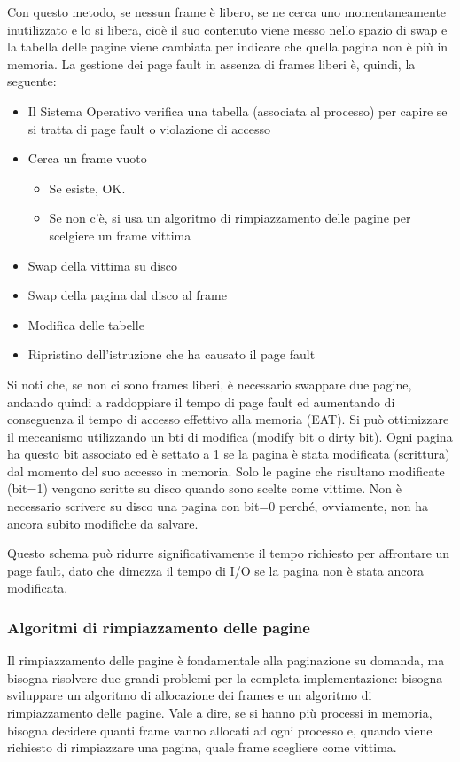 \documentclass[a4paper]{article}
\begin{document}
Con questo metodo, se nessun frame è libero, se ne cerca uno momentaneamente inutilizzato e lo si libera, cioè il suo contenuto viene messo nello spazio di swap e la tabella delle pagine viene cambiata per indicare che quella pagina non è più in memoria. La gestione dei page fault in assenza di frames liberi è, quindi, la seguente:
\begin{itemize}
    \item Il Sistema Operativo verifica una tabella (associata al processo) per capire se si tratta di page fault o violazione di accesso
    \item Cerca un frame vuoto
          \begin{itemize}
              \item Se esiste, OK.
              \item Se non c'è, si usa un algoritmo di rimpiazzamento delle pagine per scelgiere un frame vittima
          \end{itemize}
    \item Swap della vittima su disco
    \item Swap della pagina dal disco al frame
    \item Modifica delle tabelle
    \item Ripristino dell'istruzione che ha causato il page fault
\end{itemize}
Si noti che, se non ci sono frames liberi, è necessario swappare due pagine, andando quindi a raddoppiare il tempo di page fault ed aumentando di conseguenza il tempo di accesso effettivo alla memoria (EAT).
Si può ottimizzare il meccanismo utilizzando un bti di modifica (modify bit o dirty bit). Ogni pagina ha questo bit associato ed è settato a 1 se la pagina è stata modificata (scrittura) dal momento del suo accesso in memoria. Solo le pagine che risultano modificate (bit=1) vengono scritte su disco quando sono scelte come vittime. Non è necessario scrivere su disco una pagina con bit=0 perché, ovviamente, non ha ancora subito modifiche da salvare.

Questo schema può ridurre significativamente il tempo richiesto per affrontare un page fault, dato che dimezza il tempo di I/O se la pagina non è stata ancora modificata.

\subsubsection{Algoritmi di rimpiazzamento delle pagine}
Il rimpiazzamento delle pagine è fondamentale alla paginazione su domanda, ma bisogna risolvere due grandi problemi per la completa implementazione: bisogna sviluppare un algoritmo di allocazione dei frames e un algoritmo di rimpiazzamento delle pagine. Vale a dire, se si hanno più processi in memoria, bisogna decidere quanti frame vanno allocati ad ogni processo e, quando viene richiesto di rimpiazzare una pagina, quale frame scegliere come vittima.
\end{document}
